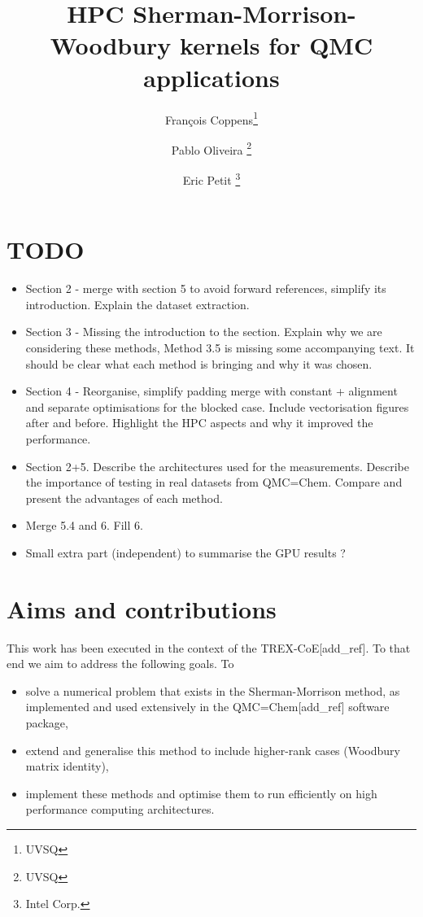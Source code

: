 \documentclass[11pt]{article}
\title{HPC Sherman-Morrison-Woodbury kernels for QMC applications}
\author{Fran\c{c}ois Coppens\thanks{UVSQ} \and Pablo Oliveira \thanks{UVSQ} \and Eric Petit \thanks{Intel Corp.}}
\numberwithin{figure}{section}
\numberwithin{table}{section}
\begin{document}
	\maketitle
	\tableofcontents
	
  \section*{TODO}
    \begin{itemize}           
      \item Section 2 - merge with section 5 to avoid forward references, simplify its introduction. Explain the dataset extraction.
      \item Section 3 - Missing the introduction to the section. Explain why we are considering these methods, Method 3.5 is missing some accompanying text. It should be clear what each method is bringing and why it was chosen.
      \item Section 4 - Reorganise, simplify padding merge with constant + alignment and separate optimisations for the blocked case. Include vectorisation figures after and before.
      Highlight the HPC aspects and why it improved the performance. 
      \item Section 2+5. Describe the architectures used for the measurements. Describe the importance of testing in real datasets from QMC=Chem. Compare and present the advantages of each method.
      \item Merge 5.4 and 6. Fill 6.
      \item Small extra part (independent) to summarise the GPU results ?
    \end{itemize}
    
  \newpage
  \section{Aims and contributions}      
    This work has been executed in the context of the TREX-CoE[add\_ref]. To that end we aim to address the following goals. To
    \begin{itemize}
      \item solve a numerical problem that exists in the Sherman-Morrison method, as implemented and used extensively in the QMC=Chem[add\_ref] software package,
      \item extend and generalise this method to include higher-rank cases (Woodbury matrix identity),
      \item implement these methods and optimise them to run efficiently on high performance computing architectures.
    \end{itemize}
      
\end{document}
